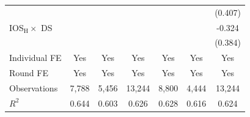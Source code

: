 \begin{table}[H]
\begin{threeparttable}
\begin{tabular}{l*{6}{c}}
            &                     &                     &                     &                     &                     &     (0.407)         \\
\addlinespace
IOS$_{\text{H}}\times$ DS&                     &                     &                     &                     &                     &      -0.324         \\
            &                     &                     &                     &                     &                     &     (0.384)         \\
\midrule
Individual FE&         Yes         &         Yes         &         Yes         &         Yes         &         Yes         &         Yes         \\
Round FE    &         Yes         &         Yes         &         Yes         &         Yes         &         Yes         &         Yes         \\
Observations&       7,788         &       5,456         &      13,244         &       8,800         &       4,444         &      13,244         \\
$R^2$       &       0.644         &       0.603         &       0.626         &       0.628         &       0.616         &       0.624         \\
\bottomrule\bottomrule
\end{tabular}
\end{threeparttable}
\end{table}
